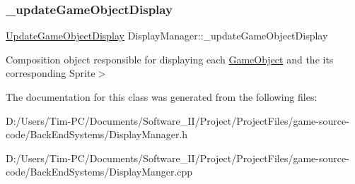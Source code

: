 \subsubsection{\texorpdfstring{\+\_\+update\+Game\+Object\+Display}{\_updateGameObjectDisplay}}
{\footnotesize\ttfamily \hyperlink{class_update_game_object_display}{Update\+Game\+Object\+Display} Display\+Manager\+::\+\_\+update\+Game\+Object\+Display\hspace{0.3cm}{\ttfamily [private]}}

Composition object responsible for displaying each \hyperlink{class_game_object}{Game\+Object} and the its corresponding Sprite$>$ 

The documentation for this class was generated from the following files\+:\begin{DoxyCompactItemize}
\item 
D\+:/\+Users/\+Tim-\/\+P\+C/\+Documents/\+Software\+\_\+\+I\+I/\+Project/\+Project\+Files/game-\/source-\/code/\+Back\+End\+Systems/Display\+Manager.\+h\item 
D\+:/\+Users/\+Tim-\/\+P\+C/\+Documents/\+Software\+\_\+\+I\+I/\+Project/\+Project\+Files/game-\/source-\/code/\+Back\+End\+Systems/Display\+Manger.\+cpp\end{DoxyCompactItemize}
